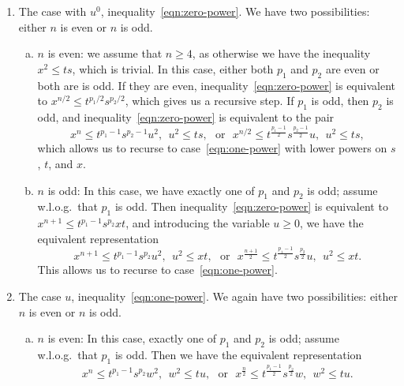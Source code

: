 \documentclass[11pt]{article}
\begin{document}
\begin{enumerate}[(1)]
\item The case with $u^0$, inequality~\eqref{eqn:zero-power}.
  We have two possibilities: either $n$ is even or $n$ is odd.
  \begin{enumerate}[a.]
  \item $n$ is even: we assume that $n \ge 4$, as otherwise we have
    the inequality $x^2 \le ts$, which is trivial.
    In this case, either both $p_1$ and $p_2$ are even or
    both are is odd.  If they are even, inequality~\eqref{eqn:zero-power} is
    equivalent to $x^{n/2} \le t^{p_1/2} s^{p_2 / 2}$, which gives us a
    recursive step. If $p_1$ is odd, then $p_2$ is odd, and
    inequality~\eqref{eqn:zero-power} is equivalent to the pair
    \begin{equation*}
      x^n \le t^{p_1 - 1} s^{p_2 - 1} u^2, ~~ u^2 \le ts,
      ~~~ \mbox{or} ~~~
      x^{n/2} \le t^{\frac{p_1 - 1}{2}} s^{\frac{p_2 - 1}{2}} u,
      ~~ u^2 \le ts,
    \end{equation*}
    which allows us to recurse to case~\eqref{eqn:one-power} with lower
    powers on $s$, $t$, and $x$.
  \item $n$ is odd: In this case, we have exactly one of $p_1$ and $p_2$ is
    odd; assume w.l.o.g.\ that $p_1$ is odd. Then
    inequality~\eqref{eqn:zero-power} is equivalent to
    $x^{n + 1} \le t^{p_1 - 1} s^{p_2} x t$, and introducing the variable
    $u \ge 0$, we have the equivalent representation
    \begin{equation*}
      x^{n + 1} \le t^{p_1 - 1} s^{p_2} u^2, ~~ u^2 \le xt,
      ~~~ \mbox{or} ~~~
      x^{\frac{n + 1}{2}} \le t^{\frac{p_1 - 1}{2}} s^{\frac{p_2}{2}} u,
      ~~ u^2 \le xt.
    \end{equation*}
    This allows us to recurse to case~\eqref{eqn:one-power}.
  \end{enumerate}
\item The case $u$, inequality~\eqref{eqn:one-power}. We again have
  two possibilities: either $n$ is even or $n$ is odd.
  \begin{enumerate}[a.]
  \item $n$ is even: In this case, exactly one of $p_1$ and $p_2$ is odd;
    assume w.l.o.g.\ that $p_1$ is odd. Then we have the equivalent
    representation
    \begin{equation*}
      x^n \le t^{p_1 - 1} s^{p_2} w^2, ~~ w^2 \le tu,
      ~~~ \mbox{or} ~~~
      x^{\frac{n}{2}} \le t^{\frac{p_1 - 1}{2}} s^{\frac{p_2}{2}} w,
      ~~ w^2 \le tu.

\end{equation*}
\end{enumerate}
\end{enumerate}
\end{document}
